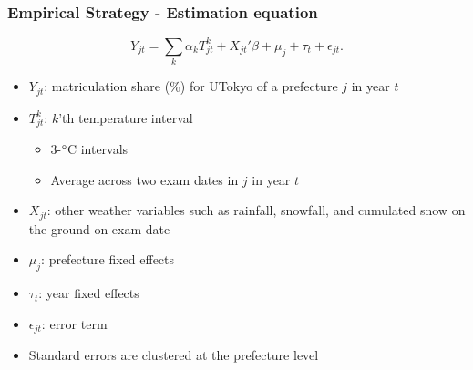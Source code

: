 \documentclass[10pt, pdfmx,hiresbb]{beamer}
\begin{document}
\begin{frame}\frametitle{Empirical Strategy - Estimation equation}
  \label{est_eq}
  \begin{equation*}
    Y_{jt} = \sum_k \alpha_k T_{jt}^k + X_{jt}' \beta + \mu_j + \tau_t + \epsilon_{jt}.
  \end{equation*}
  \begin{itemize}
    \item $Y_{jt}$: matriculation share (\%) for UTokyo of a prefecture $j$ in year $t$
    \item $T_{jt}^k$: $k$'th temperature interval 
      \begin{itemize}
        \item 3-$\degree$C intervals
        \item Average across two exam dates in $j$ in year $t$
      \end{itemize}
    \item $X_{jt}$: other weather variables such as rainfall, snowfall, and cumulated snow on the ground on exam date
    \item $\mu_j$: prefecture fixed effects
    \item $\tau_t$: year fixed effects
    \item $\epsilon_{jt}$: error term
    \item Standard errors are clustered at the prefecture level 
  \end{itemize}
  \hyperlink{temp_dev_1}{}
  \hyperlink{temp_dev_2}{}
\end{frame}
\end{document}
